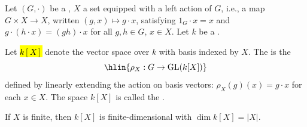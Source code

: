 \begin{definition} \label{definition:permutation_representation_of_a_group_on_a_set_over_a_field}

    Let $(G, \cdot)$ be a , $X$ a set equipped with a left action of $G$, i.e., a map $G \times X \to X$, written $(g, x) \mapsto g \cdot x$, satisfying $1_G \cdot x = x$ and $g \cdot (h \cdot x) = (gh) \cdot x$ for all $g, h \in G$, $x \in X$. Let $k$ be a .

    Let \hl{$k[X]$} denote the vector space over $k$ with basis indexed by $X$. The  is the 
    $$\hlin{\rho_X : G \to \mathrm{GL}(k[X])}$$
    defined by linearly extending the action on basis vectors: $\rho_X(g)(x) = g \cdot x$ for each $x \in X$. The space $k[X]$ is called the .

    If $X$ is finite, then $k[X]$ is finite-dimensional with $\dim k[X] = |X|$.
\end{definition}
